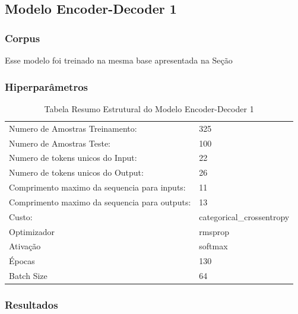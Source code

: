 \subsection{Modelo Encoder-Decoder 1} 

\subsubsection{Corpus}
Esse modelo foi treinado na mesma base apresentada na Seção %

\subsubsection{Hiperparâmetros} 

\begin{table}[h]
\centering
\begin{tabular}{ll}
Numero de Amostras Treinamento: & 325 \\
Numero de Amostras Teste: & 100 \\
Numero de tokens unicos do Input: & 22 \\
Numero de tokens unicos do Output: & 26 \\
Comprimento maximo da sequencia para inputs: & 11 \\
Comprimento maximo da sequencia para outputs: & 13 \\
Custo: & categorical\_crossentropy \\
Optimizador & rmsprop \\
Ativação & softmax \\
Épocas & 130 \\
Batch Size & 64
\end{tabular}
\caption{Tabela Resumo Estrutural do Modelo Encoder-Decoder 1}
\label{tab:res1}
\end{table}

\subsubsection{Resultados}

